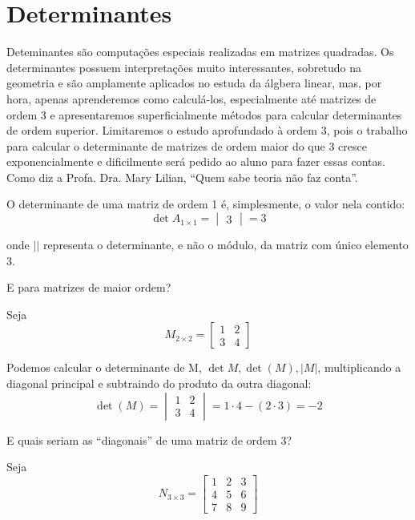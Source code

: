 \documentclass[
  portuguese,
  letterpaper,
  DIV=11,
  numbers=noendperiod]{scrreport}
\begin{document}
\section{Determinantes}\label{determinantes}

Deteminantes são computações especiais realizadas em matrizes quadradas.
Os determinantes possuem interpretações muito interessantes, sobretudo
na geometria e são amplamente aplicados no estuda da álgbera linear,
mas, por hora, apenas aprenderemos como calculá-los, especialmente até
matrizes de ordem 3 e apresentaremos superficialmente métodos para
calcular determinantes de ordem superior. Limitaremos o estudo
aprofundado à ordem 3, pois o trabalho para calcular o determinante de
matrizes de ordem maior do que 3 cresce exponencialmente e dificilmente
será pedido ao aluno para fazer essas contas. Como diz a Profa. Dra.
Mary Lilian, ``Quem sabe teoria não faz conta''.

O determinante de uma matriz de ordem 1 é, simplesmente, o valor nela
contido: \[
\det{A_{1\times1}}=
\begin{vmatrix}
    3
\end{vmatrix} = 3
\]

onde \(||\) representa o determinante, e não o módulo, da matriz com
único elemento 3.

E para matrizes de maior ordem?

Seja \[
M_{2\times2} =
\begin{bmatrix}
    1 & 2\\
    3 & 4 
\end{bmatrix}
\]

Podemos calcular o determinante de M, \(\det{M},\det{(M)}, |M|\),
multiplicando a diagonal principal e subtraindo do produto da outra
diagonal: \[
\det{(M)}=\begin{vmatrix}
    1 & 2\\
    3 & 4 
\end{vmatrix} = 1 \cdot 4 - (2 \cdot 3) = -2
\]

E quais seriam as ``diagonais'' de uma matriz de ordem 3?

Seja \[
N_{3\times3} =
\begin{bmatrix}
    1 & 2 & 3\\
    4 & 5 & 6\\
    7 & 8 & 9
\end{bmatrix}
\]
\end{document}

